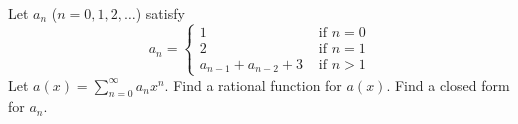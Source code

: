 Let $a_n$ ($n=0, 1, 2, \ldots$) satisfy
\[
a_n = 
\begin{cases}
1 &\text{ if } n = 0 \\
2 &\text{ if } n = 1 \\
a_{n-1} + a_{n-2} + 3 &\text{ if } n > 1
\end{cases}
\]
Let $a(x) = \sum_{n=0}^\infty a_n x^n$.
Find a rational function for $a(x)$.
Find a closed form for $a_n$.
